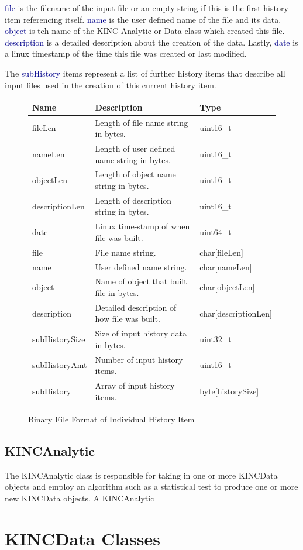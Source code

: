 \documentclass[10pt]{article}
\providecommand{\btable}[3]
{
\begin{figure}[H]
\begin{mdframed}[hidealllines=true,backgroundcolor=btablecol]
\begin{tabularx}{\textwidth}{|l|X|l|}
\hline
\textbf{Name} & \textbf{Description} & \textbf{Type} \\
\hline
#3
\hline
\end{tabularx}
\end{mdframed}
\caption{#1}
\label{#2}
\end{figure}
}
\providecommand{\h}[1]{\textcolor{darkblue}{#1}}
\begin{document}
\h{file} is the filename of the input file or an empty string if this is the 
first history item referencing itself. \h{name} is the user defined name of the 
file and its data. \h{object} is teh name of the KINC Analytic or Data class 
which created this file. \h{description} is a detailed description about the 
creation of the data. Lastly, \h{date} is a linux timestamp of the time this 
file was created or last modified.

The \h{subHistory} items represent a list of further history items that 
describe all input files used in the creation of this current history item.

\btable{Binary File Format of Individual History Item}{fig:kincdata:history}{
fileLen & Length of file name string in bytes. & uint16\_t \\
\hline
nameLen & Length of user defined name string in bytes. & uint16\_t \\
\hline
objectLen & Length of object name string in bytes. & uint16\_t \\
\hline
descriptionLen & Length of description string in bytes. & uint16\_t \\
\hline
date & Linux time-stamp of when file was built. & uint64\_t \\
\hline
file & File name string. & char[fileLen] \\
\hline
name & User defined name string. & char[nameLen] \\
\hline
object & Name of object that built file in bytes. & char[objectLen] \\
\hline
description & Detailed description of how file was built. & 
char[descriptionLen] \\
\hline
subHistorySize & Size of input history data in bytes. & uint32\_t \\
\hline
subHistoryAmt & Number of input history items. & uint16\_t \\
\hline
subHistory & Array of input history items. & byte[historySize] \\
}

\subsection{KINCAnalytic}

The KINCAnalytic class is responsible for taking in one or more KINCData objects
and employ an algorithm such as a statistical test to produce one or more 
new KINCData objects.   A KINCAnalytic 

\newpage
\section{KINCData Classes}
\end{document}
